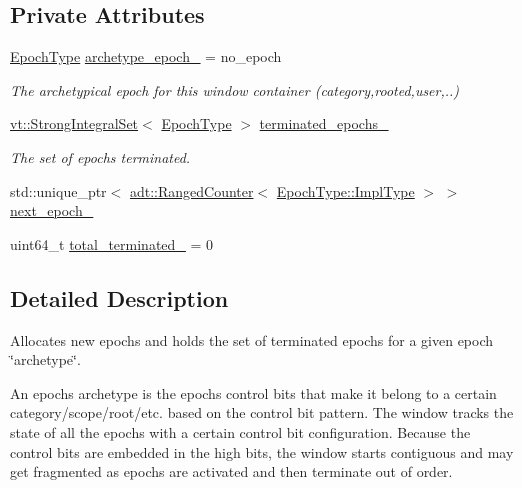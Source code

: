 \subsection*{Private Attributes}
\begin{DoxyCompactItemize}
\item 
\hyperlink{structvt_1_1epoch_1_1_epoch_type}{Epoch\+Type} \hyperlink{structvt_1_1epoch_1_1_epoch_window_a74c5c529d1a7fddf5f2d7a5cb9dbe4af}{archetype\+\_\+epoch\+\_\+} = no\+\_\+epoch
\begin{DoxyCompactList}\small\item\em The archetypical epoch for this window container (category,rooted,user,..) \end{DoxyCompactList}\item 
\hyperlink{namespacevt_aaefb2bd6d08c8dc0ff26ed43636611b1}{vt\+::\+Strong\+Integral\+Set}$<$ \hyperlink{structvt_1_1epoch_1_1_epoch_type}{Epoch\+Type} $>$ \hyperlink{structvt_1_1epoch_1_1_epoch_window_aa4facaab20709fbf16c061bd89b6a4e9}{terminated\+\_\+epochs\+\_\+}
\begin{DoxyCompactList}\small\item\em The set of epochs terminated. \end{DoxyCompactList}\item 
std\+::unique\+\_\+ptr$<$ \hyperlink{namespacevt_1_1adt_a075b41b03183cb280d453f44d5397637}{adt\+::\+Ranged\+Counter}$<$ \hyperlink{structvt_1_1epoch_1_1_epoch_type_aef70d29ac80a421e67bc15ffbe9b9e70}{Epoch\+Type\+::\+Impl\+Type} $>$ $>$ \hyperlink{structvt_1_1epoch_1_1_epoch_window_a962a9c46d450a13ccfd9bf4b822bf527}{next\+\_\+epoch\+\_\+}
\item 
uint64\+\_\+t \hyperlink{structvt_1_1epoch_1_1_epoch_window_a2c33b5bc9f0228eccd15b3788c4b1022}{total\+\_\+terminated\+\_\+} = 0
\end{DoxyCompactItemize}


\subsection{Detailed Description}
Allocates new epochs and holds the set of terminated epochs for a given epoch \char`\"{}archetype\char`\"{}. 

An epoch\textquotesingle{}s archetype is the epoch\textquotesingle{}s control bits that make it belong to a certain category/scope/root/etc. based on the control bit pattern. The window tracks the state of all the epochs with a certain control bit configuration. Because the control bits are embedded in the high bits, the window starts contiguous and may get fragmented as epochs are activated and then terminate out of order. 

